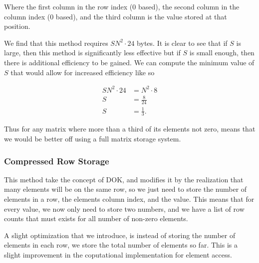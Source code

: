 \documentclass[../fem.tex]{subfiles}
\begin{document}
Where the first column in the row index ($0$ based), the second column in the
column index ($0$ based), and the third column is the value stored at that
position.

We find that this method requires $SN^2\cdot24$ bytes. It is clear to see that
if $S$ is large, then this method is significantly less effective but if $S$ is
small enough, then there is additional efficiency to be gained. We can compute
the minimum value of $S$ that would allow for increased efficiency like so

\begin{align*}
  SN^2\cdot24&=N^2\cdot8\\
  S&=\frac{8}{24}\\
  S&=\frac{1}{3}.
\end{align*}

Thus for any matrix where more than a third of its elements not zero, means
that we would be better off using a full matrix storage system.

\begin{Figure}
  \begin{center}
  \end{center}
  \label{fig:mat_dok}
\end{Figure}

\subsubsection{Compressed Row Storage}%
\label{ssub:compressed_row_storage}

This method take the concept of DOK, and modifies it by the realization that
many elements will be on the same row, so we just need to store the number of
elements in a row, the elements column index, and the value. This means that
for every value, we now only need to store two numbers, and we have a list of
row counts that must exists for all number of non-zero elements.

A slight optimization that we introduce, is instead of storing the number of
elements in each row, we store the total number of elements so far. This is a
slight improvement in the coputational implementation for element access.
\end{document}
